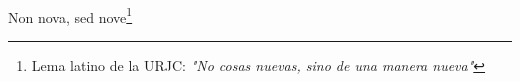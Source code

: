 \ \vspace{3cm}
\begin{flushright}
Non nova, sed nove\footnote[1]{Lema latino de la URJC: \textit{"No cosas nuevas, sino de una manera nueva"}}\\
\end{flushright}

